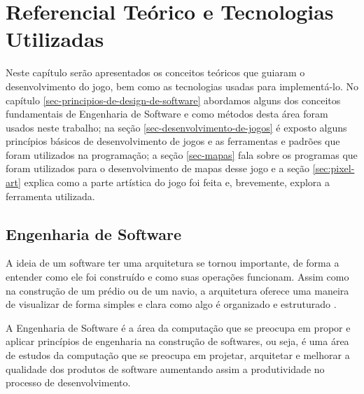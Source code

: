 \chapter{Referencial Teórico e Tecnologias Utilizadas}
\label{sec-referencial}
Neste capítulo serão apresentados os conceitos teóricos que guiaram o desenvolvimento do jogo, bem como as tecnologias usadas para implementá-lo. No capítulo \ref{sec-principios-de-design-de-software} abordamos alguns dos conceitos fundamentais de Engenharia de Software e como métodos desta área foram usados neste trabalho; na seção \ref{sec-desenvolvimento-de-jogos} é exposto alguns princípios básicos de desenvolvimento de jogos e as ferramentas e padrões que foram utilizados na programação; a seção \ref{sec-mapas} fala sobre os programas que foram utilizados para o desenvolvimento de mapas desse jogo e a seção \ref{sec:pixel-art} explica como a parte artística do jogo foi feita e, brevemente, explora a ferramenta utilizada.

\section{Engenharia de Software}
\label{sec:engenharia-de-software}
A ideia de um software ter uma arquitetura se tornou importante, de forma a entender como ele foi construído e como suas operações funcionam. Assim como na construção de um prédio ou de um navio, a arquitetura oferece uma maneira de visualizar de forma simples e clara como algo é organizado e estruturado \cite{budgen2020software}. 

A Engenharia de Software é a área da computação que se preocupa em propor e aplicar princípios de engenharia na construção de softwares\cite{engsoftmoderna}, ou seja, é uma área de estudos da computação que se preocupa em projetar, arquitetar e melhorar a qualidade dos produtos de software aumentando assim a produtividade no processo de desenvolvimento. 

